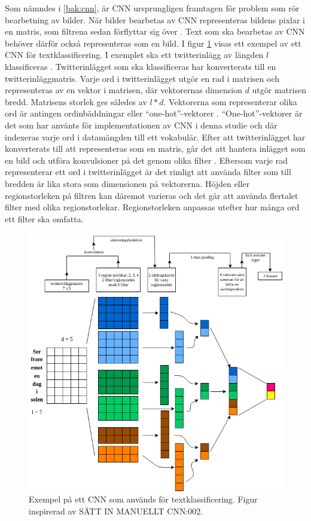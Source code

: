 \documentclass{kaumasters} %
\begin{document}
Som nämndes i \ref{bak:cnn}, är CNN ursprungligen framtagen för problem som rör bearbetning av bilder. När bilder bearbetas av CNN representeras bildens pixlar i en matris, som filtrena sedan förflyttar sig över \cite{cnn:004}. Text som ska bearbetas av CNN behöver därför också representeras som en bild. I figur \ref{fig:cnntext} visas ett exempel av ett CNN för textklassificering. I exemplet ska ett twitterinlägg av längden $l$ klassificeras \cite{cnn:002}. Twitterinlägget som ska klassificeras har konverterats till en twitterinläggmatris. Varje ord i twitterinlägget utgör en rad i matrisen och representeras av en vektor i matrisen, där vektorernas dimension $d$ utgör matrisen bredd.  Matrisens storlek ges således av $l*d$.  Vektorerna som representerar olika ord är antingen ordinbäddningar \cite{wiki:016} eller “one-hot”-vektorer \cite{cnn:004}.  “One-hot”-vektorer är det som har använts för implementationen av CNN i denna studie och där indexeras varje ord i datamängden till ett vokabulär. Efter att twitterinlägget har konverterats till att representeras som en matris, går det att hantera inlägget som en bild och utföra konvulsioner på det genom olika filter \cite{cnn:002}. Eftersom varje rad representerar ett ord i twitterinlägget är det rimligt att använda filter som till bredden är lika stora som dimensionen på vektorerna. Höjden eller regionstorleken på filtren kan däremot varieras och det går att använda flertalet filter med olika regionstorlekar. Regionstorleken anpassas utefter hur många ord ett filter ska omfatta. 

\begin{figure}[H]
\includegraphics[width=12cm]{cnn_text}
\centering
\caption{Exempel på ett CNN som används för textklassificering. Figur inspirerad av SÄTT IN MANUELLT CNN:002.}
\label{fig:cnntext}
\end{figure}
\end{document}
